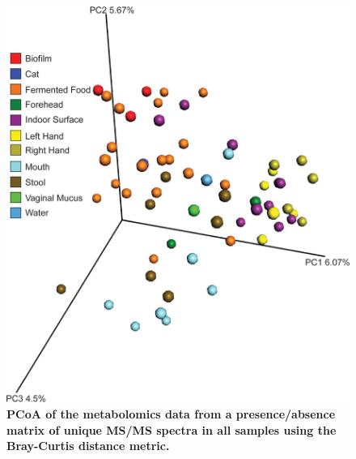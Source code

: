 \begin{figure}[htbp]
\includegraphics[width=\columnwidth]{chapter_48_hours_figures/F3.jpg}
\caption[PCoA of the metabolomics data from a presence/absence matrix of unique MS/MS spectra in all samples using the Bray-Curtis distance metric]{\textbf{PCoA of the metabolomics data from a presence/absence matrix of unique MS/MS spectra in all samples using the Bray-Curtis distance metric.}}
\label{rrfigure3}
\end{figure}

